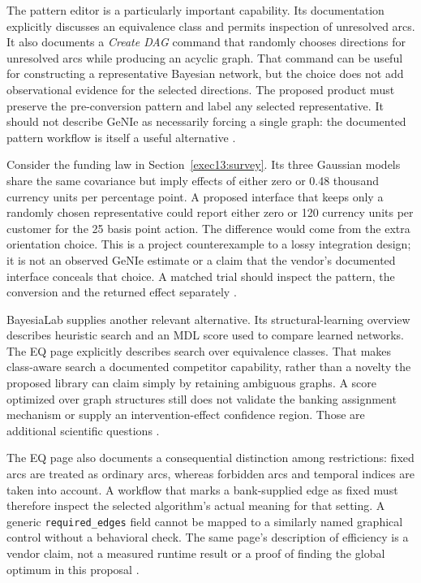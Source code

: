 The pattern editor is a particularly important capability. Its documentation
explicitly discusses an equivalence class and permits inspection of unresolved
arcs. It also documents a \emph{Create DAG} command that randomly chooses
directions for unresolved arcs while producing an acyclic graph. That command
can be useful for constructing a representative Bayesian network, but the
choice does not add observational evidence for the selected directions.
The proposed product must preserve the pre-conversion pattern and label any
selected representative. It should not describe GeNIe as necessarily forcing
a single graph: the documented pattern workflow is itself a useful alternative
\citep{exec13_genie_pattern}.

Consider the funding law in Section~\ref{exec13:survey}. Its three Gaussian
models share the same covariance but imply effects of either zero or 0.48
thousand currency units per percentage point. A proposed interface that keeps
only a randomly chosen representative could report either zero or 120 currency
units per customer for the 25 basis point action. The difference would come
from the extra orientation choice. This is a project counterexample to a
lossy integration design; it is not an observed GeNIe estimate or a claim
that the vendor's documented interface conceals that choice. A matched trial
should inspect the pattern, the conversion and the returned effect separately
\citep{exec13_examples}.

BayesiaLab supplies another relevant alternative. Its structural-learning
overview describes heuristic search and an MDL score used to compare learned
networks. The EQ page explicitly describes search over equivalence classes.
That makes class-aware search a documented competitor capability, rather
than a novelty the proposed library can claim simply by retaining ambiguous
graphs. A score optimized over graph structures still does not validate
the banking assignment mechanism or supply an intervention-effect confidence
region. Those are additional scientific questions
\citep{exec13_bayesia_structure,exec13_bayesia_eq}.

The EQ page also documents a consequential distinction among restrictions:
fixed arcs are treated as ordinary arcs, whereas forbidden arcs and temporal
indices are taken into account. A workflow that marks a bank-supplied edge
as fixed must therefore inspect the selected algorithm's actual meaning for
that setting. A generic \texttt{required\_edges} field cannot be mapped to a
similarly named graphical control without a behavioral check. The same page's
description of efficiency is a vendor claim, not a measured runtime result
or a proof of finding the global optimum in this proposal
\citep{exec13_bayesia_eq}.

